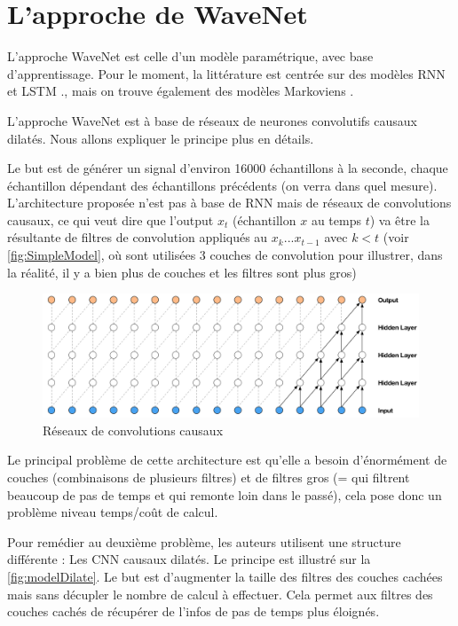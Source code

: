 \documentclass[a4paper]{article}
\begin{document}
\section{L'approche de WaveNet}

L'approche WaveNet est celle d'un modèle paramétrique, avec base d'apprentissage. Pour le moment, la littérature est centrée sur des modèles RNN et LSTM \cite{DBLP:journals/corr/ZenAEHS16}., mais on trouve également des modèles Markoviens \cite{zen2009statistical}.

L'approche WaveNet est à base de réseaux de neurones convolutifs causaux dilatés. Nous allons expliquer le principe plus en détails.

Le but est de générer un signal d'environ 16000 échantillons à la seconde, chaque échantillon dépendant des échantillons précédents (on verra dans quel mesure).
L'architecture proposée n'est pas à base de RNN mais de réseaux de convolutions causaux, ce qui veut dire que l'output $x_t$ (échantillon $x$ au temps $t$) va être la résultante de filtres de convolution appliqués au $x_k ... x_{t-1}$ avec $k<t$ (voir \autoref{fig:SimpleModel}, où sont utilisées 3 couches de convolution pour illustrer, dans la réalité, il y a bien plus de couches et les filtres sont plus gros)

\begin{figure}[h]
  \includegraphics[scale=0.2]{modelSimple.png}
  \caption{\label{fig:SimpleModel} Réseaux de convolutions causaux}
\end{figure}

Le principal problème de cette architecture est qu'elle a besoin d'énormément de couches (combinaisons de plusieurs filtres) et de filtres gros (= qui filtrent beaucoup de pas de temps et qui remonte loin dans le passé), cela pose donc un problème niveau temps/coût de calcul.

Pour remédier au deuxième problème, les auteurs utilisent une structure différente : Les CNN causaux dilatés. Le principe est illustré sur la \autoref{fig:modelDilate}. Le but est d'augmenter la taille des filtres des couches cachées mais sans décupler le nombre de calcul à effectuer. Cela permet aux filtres des couches cachés de récupérer de l'infos de pas de temps plus éloignés.
\end{document}
